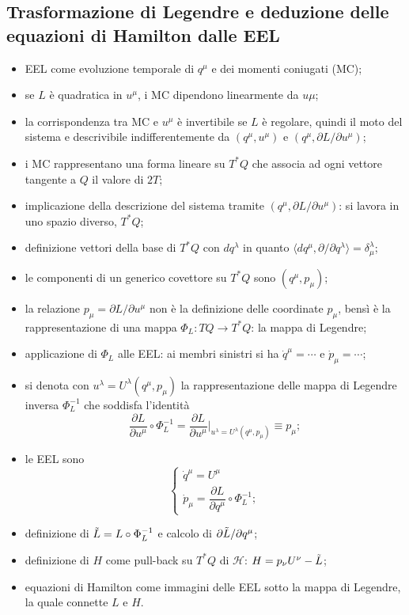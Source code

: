 \documentclass{article}
\theoremstyle{remark}
\begin{document}
\subsection{Trasformazione di Legendre e deduzione delle equazioni di Hamilton dalle EEL}
\begin{itemize}
    \item EEL come evoluzione temporale di $q^\mu$ e dei momenti coniugati (MC);
    \item se $L$ è quadratica in $u^\mu$, i MC dipendono linearmente da $u\mu$;
    \item la corrispondenza tra MC e $u^\mu$ è invertibile se $L$ è regolare, quindi il moto del sistema e descrivibile indifferentemente da $(q^\mu,u^\mu)$ e $(q^\mu,\partial L/\partial u^\mu)$;
    \item i MC rappresentano una forma lineare su $T^*Q$ che associa ad ogni vettore tangente a $Q$ il valore di $2T$;
    \item implicazione della descrizione del sistema tramite $(q^\mu,\partial L/\partial u^\mu)$: si lavora in uno spazio diverso, $T^*Q$;
    \item definizione vettori della base di $T^*Q$ con $dq^\lambda$ in quanto $\langle dq^\mu,\partial/\partial q^\lambda\rangle=\delta^\lambda_\mu$;
    \item le componenti di un generico covettore su $T^*Q$ sono $(q^\mu,p_\mu)$;
    \item la relazione $p_\mu=\partial L/\partial u^\mu$ non è la definizione delle coordinate $p_\mu$, bensì è la rappresentazione di una mappa $\Phi_L:TQ\to T^*Q$: la mappa di Legendre;
    \item applicazione di $\Phi_L$ alle EEL: ai membri sinistri si ha $\dot{q}^\mu=\cdots$ e $\dot{p}_\mu=\cdots$;
    \item si denota con $u^\lambda=U^\lambda(q^\mu,p_\mu)$ la rappresentazione delle mappa di Legendre inversa $\Phi_L^{-1}$ che soddisfa l'identità
    \begin{equation}
        \frac{\partial L}{\partial u^\mu}\circ\Phi_L^{-1}=\frac{\partial L}{\partial u^\mu}\bigg|_{u^\lambda=U^\lambda(q^\mu,p_\mu)}\equiv p_\mu;
    \end{equation}
    \item le EEL sono
    \begin{equation}
        \begin{cases}
            \dot{q}^\mu=U^\mu \\
            \dot{p}_\mu=\dfrac{\partial L}{\partial q^\mu}\circ\Phi_L^{-1};
        \end{cases}
    \end{equation}
    \item definizione di $\Tilde{L}=L\circ\Phi_L^{-1}$ e calcolo di $\partial\Tilde{L}/\partial q^\mu$;
    \item definizione di $H$ come pull-back su $T^*Q$ di $\mathcal{H}$: $H=p_\nu U^\nu-\Tilde{L}$;
    \item equazioni di Hamilton come immagini delle EEL sotto la mappa di Legendre, la quale connette $L$ e $H$.
\end{itemize}
\end{document}
